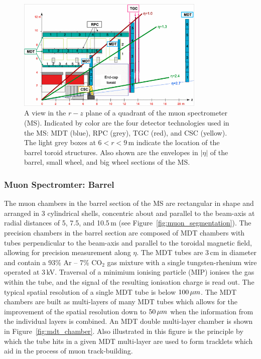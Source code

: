 \begin{figure}[!htb]
    \begin{center}
        \includegraphics[width=0.8\textwidth]{figures/chapter2/muon_spec/atlas_muon_plan_view_eta}
        \caption{
            A view in the $r-z$ plane of a quadrant of the muon spectrometer (MS).
            Indicated by color are the four detector technologies used in the MS:
            MDT (blue), RPC (grey), TGC (red), and CSC (yellow).
            The light grey boxes at $6 < r < 9$\,m indicate the location of the
            barrel toroid structures.
            Also shown are the envelopes in $\lvert \eta \rvert$ of the barrel,
            small wheel, and big wheel sections of the MS.
        }
        \label{fig:muon_plan_view_eta}
    \end{center}
\end{figure}
\FloatBarrier

\subsubsection{Muon Spectromter: Barrel}
\label{sec:ms_barrel}

The muon chambers in the barrel section of the MS are rectangular in shape and arranged in 3 cylindrical shells,
concentric about and parallel to the beam-axis at radial distances of 5, 7.5, and 10.5\,m (see Figure~\ref{fig:muon_segmentation}).
The precision chambers in the barrel section are composed of MDT chambers
with tubes perpendicular to the beam-axis and parallel to the toroidal magnetic field,
allowing for precision measurement along $\eta$.
The MDT tubes are $3\,$cm in diameter and contain a 93\% Ar -- 7\% CO$_2$ gas mixture
with a single tungsten-rhenium wire operated at $3$\,kV.
Traversal of a minimium ionising particle (MIP) ionises the gas within the tube,
and the signal of the resulting ionisation charge is read out.
The typical spatial resolution of a single MDT tube is below $100\,\mu m$.
The MDT chambers are built as multi-layers of many MDT tubes which allows for the improvement
of the spatial resolution down to $50\,\mu m$ when the information from the individual layers is combined.
An MDT double multi-layer chamber is shown in Figure~\ref{fig:mdt_chamber}.
Also illustrated in this figure is the principle by which the tube hits in a given MDT
multi-layer are used to form tracklets which aid in the process of muon track-building.

